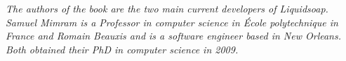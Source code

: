 \documentclass[
coverwidth=6in,
coverheight=9in,
spinewidth=0.5765in, %
bleedwidth=.125in,
12pt,
marklength=0in,
]{bookcover}
\begin{document}
\begin{bookcover}
{\begin{minipage}[t]{\coverwidth}
\begin{center}
\begin{minipage}{.83\textwidth}
\begin{onehalfspace}
\begin{adjustwidth}{1cm}{1cm}
              \vspace{1cm}

              \emph{The authors of the book are the two main current developers
                of Liquidsoap. Samuel Mimram is a Professor in computer science
                in École polytechnique in France and Romain Beauxis and is a
                software engineer based in New Orleans. Both obtained their PhD
                in computer science in 2009.}

              \vspace{25mm}

            \end{adjustwidth}
          \end{onehalfspace}
        \end{minipage}
      \end{center}
    \end{minipage}
    \vfill
    \vspace{1cm}
  }
\end{bookcover}
\end{document}

